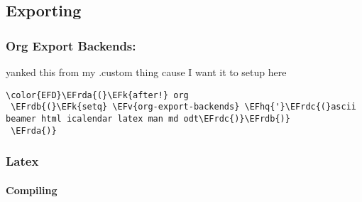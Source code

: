 \documentclass{article}
\newcommand{\EFk}[1]{\textcolor{EFk}{#1}} %
\newcommand{\EFv}[1]{\textcolor{EFv}{#1}} %
\newcommand{\EFhq}[1]{#1} %
\newcommand{\EFrda}[1]{\textcolor{EFrda}{#1}} %
\newcommand{\EFrdb}[1]{\textcolor{EFrdb}{#1}} %
\newcommand{\EFrdc}[1]{\textcolor{EFrdc}{#1}} %
\begin{document}
\subsection{Exporting}
\label{sec:orge43823e}
\subsubsection{Org Export Backends:}
\label{sec:org60991fc}
yanked this from my .custom thing cause I want it to setup here
\begin{Code}
\begin{Verbatim}
\color{EFD}\EFrda{(}\EFk{after!} org 
 \EFrdb{(}\EFk{setq} \EFv{org-export-backends} \EFhq{'}\EFrdc{(}ascii beamer html icalendar latex man md odt\EFrdc{)}\EFrdb{)}
 \EFrda{)}
\end{Verbatim}
\end{Code}

\subsubsection{Latex}
\label{sec:org9b4423b}
\paragraph{Compiling}
\label{sec:org421f86b}
\end{document}
